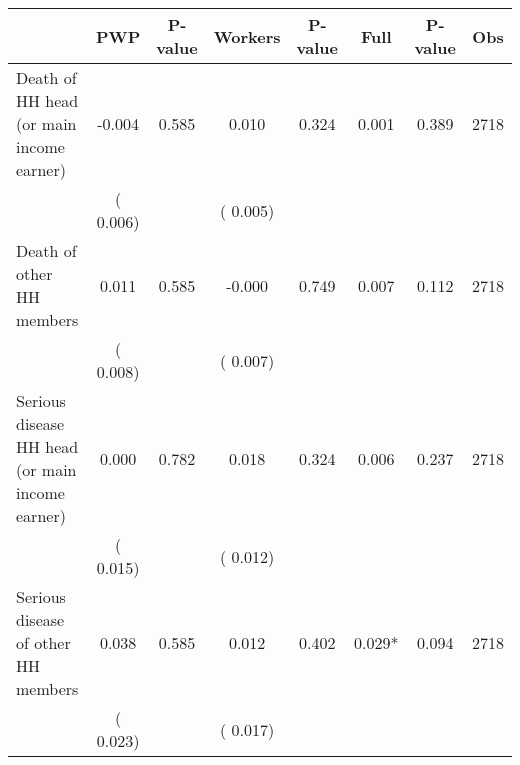 
\begin{tabular}{l*{7}{c}}\hline&\multicolumn{1}{c}{PWP}&\multicolumn{1}{c}{P-value}&\multicolumn{1}{c}{Workers}&\multicolumn{1}{c}{P-value}&\multicolumn{1}{c}{Full}&\multicolumn{1}{c}{P-value}&\multicolumn{1}{c}{Obs} \\ \hline

 Death of HH head (or main income earner)       &             -0.004       &        0.585  &              0.010       &        0.324  &              0.001       &              0.389 &  2718 \\ 
                       &       (       0.006)             &                               &       (       0.005)                     &                               &                                               &                                &                      \\ 

 Death of other HH members       &              0.011       &        0.585  &             -0.000       &        0.749  &              0.007       &              0.112 &  2718 \\ 
                       &       (       0.008)             &                               &       (       0.007)                     &                               &                                               &                                &                      \\ 

 Serious disease HH head (or main income earner)       &              0.000       &        0.782  &              0.018       &        0.324  &              0.006       &              0.237 &  2718 \\ 
                       &       (       0.015)             &                               &       (       0.012)                     &                               &                                               &                                &                      \\ 

 Serious disease of other HH members       &              0.038       &        0.585  &              0.012       &        0.402  &              0.029*       &              0.094 &  2718 \\ 
                       &       (       0.023)             &                               &       (       0.017)                     &                               &                                               &                                &                      \\ 


\end{tabular}
